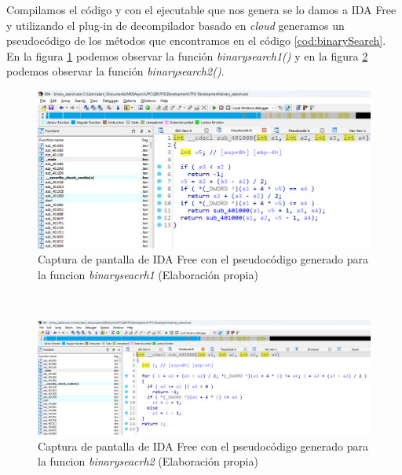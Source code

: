 Compilamos el código y con el ejecutable que nos genera se lo damos a IDA Free y
utilizando el plug-in de decompilador basado en \textit{cloud} generamos un
pseudocódigo de los métodos que encontramos en el código \ref{cod:binarySearch}.
En la figura \ref{fig:IDAPro_binaryseacrh1} podemos observar la función \textit{binarysearch1()}
y en la figura \ref{fig:IDAPro_binaryseacrh2} podemos observar la función \textit{binarysearch2()}.

\begin{figure}[H]
    \begin{center}
      \includegraphics[width=15cm]{figuras/Capitulo_03/IDAPro_binaryseacrh1.png}
    \end{center}
    \caption[Captura de pantalla de IDA Free con el pseudocódigo generado para la funcion \textit{binaryseacrh1}]{Captura de pantalla de IDA Free con el pseudocódigo generado para la funcion \textit{binaryseacrh1} (Elaboración propia)}
    \label{fig:IDAPro_binaryseacrh1}
\end{figure}\

\begin{figure}[H]
    \begin{center}
      \includegraphics[width=15cm]{figuras/Capitulo_03/IDAPro_binaryseacrh2.png}
    \end{center}
    \caption[Captura de pantalla de IDA Free con el pseudocódigo generado para la funcion \textit{binaryseacrh2}]{Captura de pantalla de IDA Free con el pseudocódigo generado para la funcion \textit{binaryseacrh2} (Elaboración propia)}
    \label{fig:IDAPro_binaryseacrh2}
\end{figure}\

